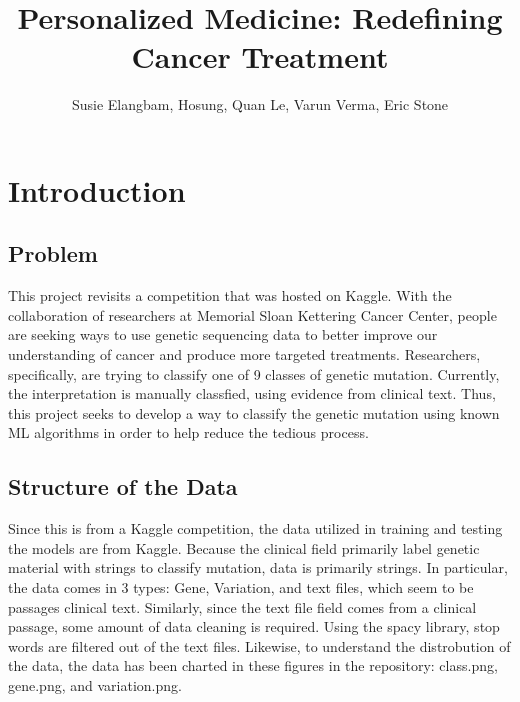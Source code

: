 \documentclass{article}
\title{Personalized Medicine: Redefining Cancer Treatment}
\author{Susie Elangbam, Hosung, Quan Le, Varun Verma, Eric Stone}
\begin{document}
    \maketitle
    
    \iffalse
    this won't appear in the final pdf.  just a reminder for anyone contributing.  
    REQUIREMENTS (verbatim as written in the doc)
    At a minimum, your final report must 
    describe the problem/application and motivation, survey related work, discuss your approach, and explain your
    results/conclusions/impact of your project. It should include enough detail such that someone else can reproduce
    your method and results. You are also required to provide a link to a GitHub repository where your code is stored.
    SUBMITTING DETAILS
    Save your report as a PDF file of 5 pages or less. Again, The corresponding member of the team should submit
    the final PDF and the GitHub link through Sakai by the announced deadline.
    \fi
    
    \section{Introduction}
    \subsection{Problem}
    This project revisits a competition that was hosted on Kaggle.  With the collaboration of researchers at Memorial Sloan Kettering Cancer Center, people are seeking ways to use genetic sequencing data to better improve our understanding of cancer and produce more targeted treatments.  Researchers, specifically, are trying to classify one of 9 classes of genetic mutation.  Currently, the interpretation is manually classfied, using evidence from clinical text. Thus, this project seeks to develop a way to classify the genetic mutation using known ML algorithms in order to help reduce the tedious process. 
    \subsection{Structure of the Data}
    Since this is from a Kaggle competition, the data utilized in training and testing the models are from Kaggle.  Because the clinical field primarily label genetic material with strings to classify mutation, data is primarily strings. In particular, the data comes in 3 types: Gene, Variation, and text files, which seem to be passages clinical text.  Similarly, since the text file field comes from a clinical passage, some amount of data cleaning is required.  Using the spacy library, stop words are filtered out of the text files.  Likewise, to understand the distrobution of the data, the data has been charted in these figures in the repository: class.png, gene.png, and variation.png.  
\end{document}
